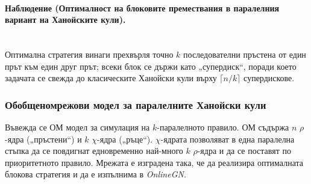 \paragraph{Наблюдение (Оптималност на блоковите премествания в паралелния вариант на Ханойските кули).}
\mbox{}\\
Оптимална стратегия винаги прехвърля точно \(k\) последователни пръстена от един прът към един друг прът; всеки блок се държи като „супердиск“, поради което задачата се свежда до класическите Ханойски кули върху \(\lceil n/k\rceil\) супердискове.

\subsubsection{Обобщеномрежови модел за паралелните Ханойски кули}
\hspace*{2.5em}Въвежда се ОМ модел за симулация на \(k\)-паралелното правило. ОМ съдържа \(n\) \(\rho\)-ядра („пръстени“) и \(k\) \(\chi\)-ядра („ръце“). \(\chi\)-ядрата позволяват в една паралелна стъпка да се повдигнат едновременно най-много \(k\) \(\rho\)-ядра и да се поставят по приоритетното правило. Мрежата е изградена така, че да реализира оптималната блокова стратегия и да е изпълнима в \textit{OnlineGN}.


